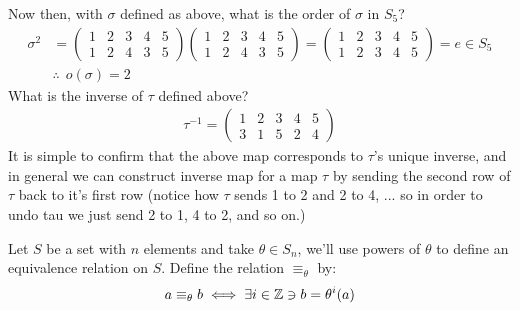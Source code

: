 Now then, with $\sigma$ defined as above, what is the order of $\sigma$ in $S_5$?
\begin{align}
    \sigma^2&=\begin{pmatrix}
    1&2&3&4&5 \\ 1&2&4&3&5
    \end{pmatrix}\begin{pmatrix}
    1&2&3&4&5 \\ 1&2&4&3&5
    \end{pmatrix} = \begin{pmatrix}
    1&2&3&4&5 \\ 1&2&3&4&5
    \end{pmatrix} = e \in S_5 \nonumber \\
    &\therefore \ \ o(\sigma)=2 \nonumber
\end{align}
What is the inverse of $\tau$ defined above?
\begin{align}
    \tau^{-1}= \begin{pmatrix}
    1&2&3&4&5 \\ 3&1&5&2&4
    \end{pmatrix}\nonumber
\end{align}
It is simple to confirm that the above map corresponds to $\tau$'s unique inverse, and in general we
can construct inverse map for a map $\tau$ by sending the second row of $\tau$ back to it's first
row (notice how $\tau$ sends 1 to 2 and 2 to 4, ... so in order to undo tau we just send 2 to 1, 4
to 2, and so on.)

Let $S$ be a set with $n$ elements and take $\theta \in S_n$, we'll use powers of $\theta$ to define
an equivalence relation on $S$. Define the relation $\equiv_{\theta}$ by:
\begin{align}
    a\equiv_{\theta} b \iff \exists i \in {\mathbb{Z}} \ni b= \theta^i(a) \nonumber
\end{align}

